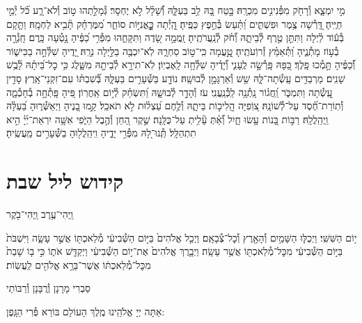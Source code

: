 \documentclass[twoside, openany, parskip=half, 11pt]{book}
\begin{document}
מִ֣י יִמְצָ֑א וְ֯רָחֹ֖ק מִפְּ֯נִינִ֣ים מִכְרָֽהּ׃ \hfill \break
בָּ֣טַח בָּ֭הּ לֵ֥ב בַּעְלָּ֑הּ וְ֝֯שָׁלָ֗ל לֹ֣א יֶחְסָר׃ \hfill \break
גְּ֯מָלַ֣תְהוּ ט֣וֹב וְ֯לֹא־רָ֑ע כֹּ֝֗ל יְ֯מֵ֣י חַיֶּֽיהָ׃ \hfill \break
דָּֽ֭רְ֯שָׁה צֶ֥מֶר וּפִשְׁתִּ֑ים וַ֝תַּ֗עַשׂ בְּ֯חֵ֣פֶץ כַּפֶּֽיהָ׃ \hfill \break
הָֽ֭יְ֯תָה כׇׇׇׇׇׇׇׇׇּֽאֳנִיּ֣וֹת סוֹחֵ֑ר מִ֝מֶּרְחָ֗ק תָּ֘בִ֥יא לַחְמָֽהּ׃ \hfill \break
וַתָּ֤קָם בְּ֯ע֬וֹד לַ֗יְלָה וַתִּתֵּ֣ן טֶ֣רֶף לְ֯בֵיתָ֑הּ וְ֝֯חֹ֗ק לְ֯נַֽעֲרֹתֶֽיהָ׃ \hfill \break
זָֽמֲמָ֣ה שָׂ֭דֶה וַתִּקָּחֵ֑הוּ מִפְּ֯רִ֥י כַ֝פֶּ֗יהָ נָ֣טְ֯עָה כָּֽרֶם׃ \hfill \break
חָֽגְ֯רָ֣ה בְ֯ע֣וֹז מָתְ֯נֶ֑יהָ וַ֝תְּ֯אַמֵּ֗ץ זְ֯רוֹֽעֹתֶֽיהָ׃ \hfill \break
טָֽ֣֭עֲמָה כִּֽי־ט֣וֹב סַחְרָ֑הּ לֹֽא־יִכְבֶּ֖ה בַלַּ֣יְלָה נֵרָֽהּ׃ \hfill \break
יָ֭דֶיהָ שִׁלְּ֯חָ֣ה בַכִּישׁ֑וֹר וְ֝֯כַפֶּ֗יהָ תָּ֣מְ֯כוּ פָֽלֶךְ׃ \hfill \break
כַּ֭פָּהּ פָּֽרְ֯שָׂ֣ה לֶֽעָנִ֑י וְ֝֯יָדֶ֗יהָ שִׁלְּ֯חָ֥ה לָֽאֶבְיֽוֹן׃ \hfill \break
לֹֽא־תִירָ֣א לְ֯בֵיתָ֣הּ מִשָּׁ֑לֶג כִּ֥י כׇל־בֵּ֝יתָ֗הּ לָ֘בֻ֥שׁ שָׁנִֽים׃ \hfill \break
מַרְבַדִּ֥ים עָֽשְׂ֯תָה־לָּ֑הּ שֵׁ֖שׁ וְ֯אַרְגָּמָ֣ן לְ֯בוּשָֽׁהּ׃ \hfill \break
נוֹדָ֣ע בַּשְּׁ֯עָרִ֣ים בַּעְלָּ֑הּ בְּ֝֯שִׁבְתּ֗וֹ עִם־זִקְנֵי־אָֽרֶץ׃ \hfill \break
סָדִ֣ין עָֽ֭שְׂ֯תָה וַתִּמְכֹּ֑ר וַֽ֝חֲג֗וֹר נָֽתְ֯נָ֥ה לַֽכְּ֯נַֽעֲנִֽי׃ \hfill \break
עֹז וְ֯הָדָ֣ר לְ֯בוּשָׁ֑הּ וַ֝תִּשְׂחַ֗ק לְ֯י֣וֹם אַֽחֲרֽוֹן׃ \hfill \break
פִּ֭יהָ פָּֽתְ֯חָ֣ה בְ֯חָכְ֯מָ֑ה וְ֯תֽוֹרַת־חֶ֝֗סֶד עַל־לְ֯שׁוֹנָֽהּ׃ \hfill \break
צ֭וֹֽפִיָּה הֲֽלִיכ֣וֹת בֵּיתָ֑הּ וְ֯לֶ֥חֶם עַ֝צְל֗וּת לֹ֣א תֹאכֵֽל׃ \hfill \break
קָ֣מוּ בָ֭נֶיהָ וַיְאַשְּׁ֯ר֑וּהָ בַּ֝עְלָּ֗הּ וַֽיְהַֽלֲלָֽהּ׃ \hfill \break
רַבּ֣וֹת בָּ֭נוֹת עָ֥שׂוּ חָ֑יִל וְ֝֯אַ֗תְּ עָ֘לִ֥יתְ עַל־כֻּלָּֽנָה׃ \hfill \break
שֶׁ֣קֶר הַ֭חֵן וְ֯הֶ֣בֶל הַיֹּ֑פִי אִשָּׁ֥ה יִרְאַת־יְ֜יָ֗ הִ֣יא תִתְהַלָּֽל׃\hfill \break
תְּֽ֯נוּ־לָ֭הּ מִפְּ֯רִ֣י יָדֶ֑יהָ וִֽיהַֽלֲל֖וּהָ בַשְּׁ֯עָרִ֣ים מַֽעֲשֶֽׂיהָ׃\hfill \break


\section*{ קידוש ליל שבת }

\begin{small}וַֽיְהִי־עֶ֥רֶב וַֽיְהִי־בֹ֖קֶר\end{small}
י֥וֹם הַשִּׁשִּֽׁי׃ וַיְכֻלּ֛וּ הַשָּׁמַ֥יִם וְ֯הָאָ֖רֶץ וְ֯כׇל־צְ֯בָאָֽם׃ וַיְכַ֤ל אֱלֹהִים֙ בַּיּ֣וֹם הַשְּׁ֯בִיעִ֔י מְ֯לַאכְתּ֖וֹ אֲשֶׁ֣ר עָשָׂ֑ה וַיִּשְׁבֹּת֙ בַּיּ֣וֹם הַשְּׁ֯בִיעִ֔י מִכׇּל־מְ֯לַאכְתּ֖וֹ אֲשֶׁ֥ר עָשָֽׂה׃ וַיְבָ֤רֶךְ אֱלֹהִים֙ אֶת־י֣וֹם הַשְּׁ֯בִיעִ֔י וַיְקַדֵּ֖שׁ אֹת֑וֹ כִּ֣י ב֤וֹ שָׁבַת֙ מִכׇּל־מְ֯לַאכְתּ֔וֹ אֲשֶׁר־בָּרָ֥א אֱלֹהִ֖ים לַֽעֲשֽׂוֹת׃

\begin{footnotesize}
סַבְרִי מָרָנָן וְ֯רֲבָּנָן וְ֯רַבּוֹתַי\\
\end{footnotesize}
אַתָּה יְיָ אֱלֹהֵֽינוּ מֶֽלֶךְ הָעוֹלָם בּוֹרֵא פְּ֯רִי הַגָּֽפֶן:
\end{document}
